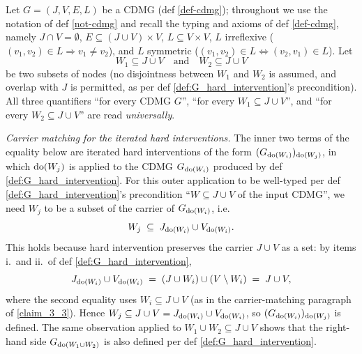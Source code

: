 \begin{Lem}\label{hard-interventions-commute}
    Let $G = (J, V, E, L)$ be a CDMG (def \ref{def-cdmg}); throughout we use the notation of def \ref{not-cdmg} and recall the typing and axioms of def \ref{def-cdmg}, namely $J \cap V = \emptyset$, $E \subseteq (J \cup V) \times V$, $L \subseteq V \times V$, $L$ irreflexive ($(v_1, v_2) \in L \Rightarrow v_1 \neq v_2$), and $L$ symmetric ($(v_1, v_2) \in L \Leftrightarrow (v_2, v_1) \in L$). Let
    \[ W_1 \subseteq J \cup V \quad\text{and}\quad W_2 \subseteq J \cup V \]
    be two subsets of nodes (no disjointness between $W_1$ and $W_2$ is assumed, and overlap with $J$ is permitted, as per def \ref{def:G_hard_intervention}'s precondition). All three quantifiers ``for every CDMG $G$'', ``for every $W_1 \subseteq J \cup V$'', and ``for every $W_2 \subseteq J \cup V$'' are read \emph{universally}.

    \emph{Carrier matching for the iterated hard interventions.} The inner two terms of the equality below are iterated hard interventions of the form $(G_{\operatorname{do}(W_i)})_{\operatorname{do}(W_j)}$, in which $\operatorname{do}(W_j)$ is applied to the CDMG $G_{\operatorname{do}(W_i)}$ produced by def \ref{def:G_hard_intervention}. For this outer application to be well-typed per def \ref{def:G_hard_intervention}'s precondition ``$W \subseteq J \cup V$ of the input CDMG'', we need $W_j$ to be a subset of the carrier of $G_{\operatorname{do}(W_i)}$, i.e.\
    \[ W_j \;\subseteq\; J_{\operatorname{do}(W_i)} \cup V_{\operatorname{do}(W_i)}. \]
    This holds because hard intervention preserves the carrier $J \cup V$ as a set: by items i.\ and ii.\ of def \ref{def:G_hard_intervention},
    \[
        J_{\operatorname{do}(W_i)} \cup V_{\operatorname{do}(W_i)} \;=\; (J \cup W_i) \cup (V \setminus W_i) \;=\; J \cup V,
    \]
    where the second equality uses $W_i \subseteq J \cup V$ (as in the carrier-matching paragraph of \ref{claim_3_3}). Hence $W_j \subseteq J \cup V = J_{\operatorname{do}(W_i)} \cup V_{\operatorname{do}(W_i)}$, so $(G_{\operatorname{do}(W_i)})_{\operatorname{do}(W_j)}$ is defined. The same observation applied to $W_1 \cup W_2 \subseteq J \cup V$ shows that the right-hand side $G_{\operatorname{do}(W_1 \cup W_2)}$ is also defined per def \ref{def:G_hard_intervention}.


\end{Lem}
